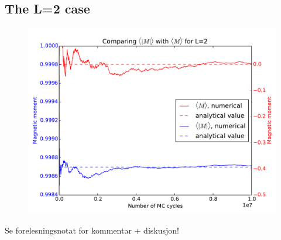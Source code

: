 



\subsection{The L=2 case}


\begin{figure}[H]
	\centering
	\includegraphics[width=0.7\linewidth]{../results/4b/L_2_mag_magabs}
	\caption{}
	\label{fig:l2magmagabs}
\end{figure}

Se forelesningsnotat for kommentar + diskusjon!

